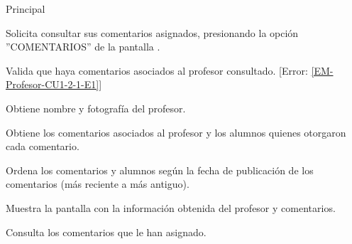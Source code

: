 \begin{UCtrayectoria}{Principal}

	\UCpaso [\UCactor] Solicita consultar sus comentarios asignados, presionando la opción ''COMENTARIOS'' de la pantalla .

	\UCpaso Valida que haya comentarios asociados al profesor consultado. [Error: \ref{EM-Profesor-CU1-2-1-E1}]

	\UCpaso Obtiene nombre y fotografía del profesor. 

	\UCpaso Obtiene los comentarios asociados al profesor y los alumnos quienes otorgaron cada comentario. 

	\UCpaso Ordena los comentarios y alumnos según la fecha de publicación de los comentarios (más reciente a más antiguo).

	\UCpaso Muestra la pantalla  con la información obtenida del profesor y comentarios.

	\UCpaso[\UCactor] Consulta los comentarios que le han asignado.

\end{UCtrayectoria}
